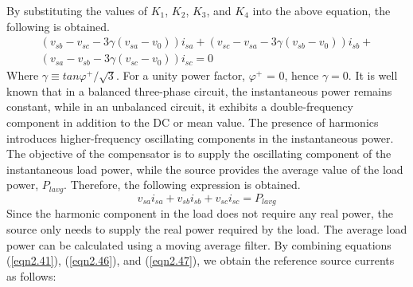 By substituting the values of $K_1$, $K_2$, $K_3$, and $K_4$ into the above equation, the following is obtained.
\begin{equation}
\begin{split}
(v_{sb}-v_{sc}-3\gamma (v_{sa}-v_0))i_{sa}+(v_{sc}-v_{sa}-3\gamma (v_{sb}-v_0))i_{sb}+ \\
(v_{sa}-v_{sb}-3\gamma (v_{sc}-v_0))i_{sc} = 0
\end{split}
\label{eqn2.46}
\end{equation}
Where $\gamma \equiv tan \varphi^+/\sqrt{3}$. For a unity power factor, $\varphi^+$ = 0, hence $\gamma = 0$. It is well known that in a balanced three-phase circuit, the instantaneous power remains constant, while in an unbalanced circuit, it exhibits a double-frequency component in addition to the DC or mean value. The presence of harmonics introduces higher-frequency oscillating components in the instantaneous power. The objective of the compensator is to supply the oscillating component of the instantaneous load power, while the source provides the average value of the load power, $P_{lavg}$. Therefore, the following expression is obtained.
\begin{equation}
v_{sa}i_{sa}+v_{sb}i_{sb}+v_{sc}i_{sc}=P_{lavg}
\label{eqn2.47}
\end{equation}
Since the harmonic component in the load does not require any real power, the source only needs to supply the real power required by the load. The average load power can be calculated using a moving average filter. By combining equations (\ref{eqn2.41}), (\ref{eqn2.46}), and (\ref{eqn2.47}), we obtain the reference source currents as follows:

